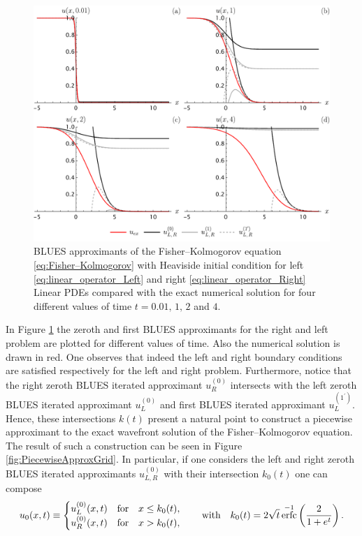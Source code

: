 \documentclass[amsmath,amssymb,amsfonts,aps,pre,preprint,superscriptaddress,bibnotes,showpacs,showkeys,longbibliography]{revtex4-1}
\DeclareMathOperator{\erfc}{erfc}
\begin{document}
\begin{figure}[!ht]
    \centering
    \includegraphics[width=\linewidth]{Figures/GridU1.pdf}
    \caption{BLUES approximants of the Fisher–Kolmogorov equation \eqref{eq:Fisher–Kolmogorov} with Heaviside initial condition for left \eqref{eq:linear_operator_Left} and right \eqref{eq:linear_operator_Right} Linear PDEs compared with the exact numerical solution for four different values of time $t=0.01,\, 1,\, 2$ and $4$.}
    \label{fig:GridU1}
\end{figure}
In Figure \ref{fig:GridU1} the zeroth and first BLUES approximants for the right and left problem are plotted for different values of time. Also the numerical solution is drawn in red. One observes that indeed the left and right boundary conditions are satisfied respectively for the left and right problem. Furthermore, notice that the right zeroth BLUES iterated approximant $u^{(0)}_R$ intersects with the left zeroth BLUES iterated approximant $u^{(0)}_L$ and first BLUES iterated approximant $u^{(1^\prime)}_L$. Hence, these intersections $k(t)$ present a natural point to construct a piecewise approximant to the exact wavefront solution of the Fisher–Kolmogorov equation. The result of such a construction can be seen in Figure \ref{fig:PiecewiseApproxGrid}. In particular, if one considers the left and right zeroth BLUES iterated approximants $u^{(0)}_{L,R}$ with their intersection $k_0(t)$ one can compose
\begin{align}
    u_0(x,t)\equiv
    \begin{cases}
    u^{(0)}_{L}(x,t) \qq{for} x\leq k_0(t),\\
    u^{(0)}_{R}(x,t) \qq{for} x>k_0(t),
    \end{cases}
    \qq{with} k_0(t) = 2\sqrt{t}\erfc^{-1}\left(\frac{2}{1+e^{t}}\right).
\end{align}
\end{document}
